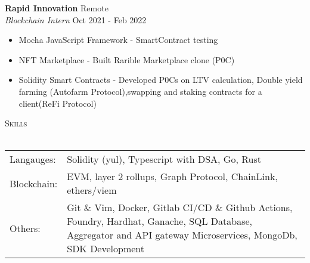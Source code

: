 \documentclass[a4paper]{article}
\newcommand{\lineunder} {
    \vspace*{-8pt} \\
    \hspace*{-18pt} \hrulefill \\
}
\newcommand{\header} [1] {
    {\hspace*{-18pt}\vspace*{6pt} \textsc{#1}}
    \vspace*{-6pt} \lineunder
}
\begin{document}
\textbf{Rapid Innovation} \hfill Remote\\
\textit{Blockchain Intern} \hfill Oct 2021 - Feb 2022\\
\vspace{-1mm}
\begin{itemize} \itemsep 1pt
	\item Mocha JavaScript Framework - SmartContract testing
	\item NFT Marketplace - Built Rarible Marketplace clone (P0C)
    \item Solidity Smart Contracts - Developed P0Cs on LTV calculation, Double yield farming (Autofarm Protocol),swapping and staking contracts for a client(ReFi Protocol)
\end{itemize}
\vspace{1mm}
\header{Skills}
\begin{tabularx}{\textwidth}{ l X } 
	Langauges:  & Solidity (yul), Typescript with DSA, Go, Rust\\
    Blockchain: & EVM, layer 2 rollups, Graph Protocol, ChainLink, ethers/viem\\
	Others:     & Git \& Vim, Docker, Gitlab CI/CD \& Github Actions, Foundry, Hardhat, Ganache, SQL Database, Aggregator and API gateway Microservices, MongoDb, SDK Development \\
\end{tabularx}
\vspace{2mm}
\end{document}
